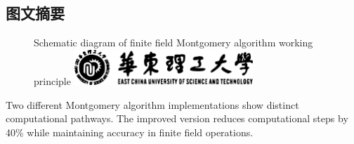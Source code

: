 
\subsection*{图文摘要}

\begin{figure}[H] %
	\centering
	{Schematic diagram of finite field Montgomery algorithm working principle} %
	\includegraphics[width=0.6\textwidth,height=0.1\textheight]{figures/figure2.eps}
\end{figure}

Two different Montgomery algorithm implementations show distinct computational pathways. 
The improved version reduces computational steps by 40\% while maintaining accuracy in finite field operations.



